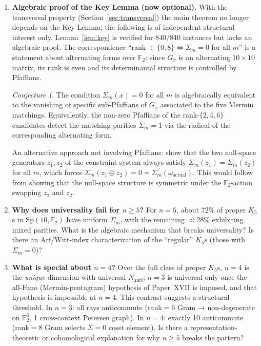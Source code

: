 \documentclass[11pt,a4paper]{article}
\theoremstyle{remark}
\newtheorem*{conjecture*}{Conjecture}
\newcommand{\Sp}{\mathrm{Sp}}
\begin{document}
\begin{enumerate}

\item\label{open:keylemma} \textbf{Algebraic proof of the Key Lemma (now optional).}
  With the transversal property (Section~\ref{sec:transversal}) the main theorem no
  longer depends on the Key Lemma; the following is of independent structural
  interest only.
  Lemma~\ref{lem:key} is verified for 840/840 instances but lacks an
  algebraic proof.
  The correspondence ``rank $\in \{0,8\} \Leftrightarrow \Sigma_m = 0$ for all $m$''
  is a statement about alternating forms over $\mathbb{F}_2$: since $G_x$ is an alternating
  $10 \times 10$ matrix, its rank is even and its determinantal structure is controlled
  by Pfaffians.
  \begin{conjecture*}
  The condition $\Sigma_m(x) = 0$ for all $m$ is algebraically equivalent to the vanishing
  of specific sub-Pfaffians of $G_x$ associated to the five Mermin matchings.
  Equivalently, the non-zero Pfaffians of the rank-$\{2,4,6\}$ candidates detect the
  matching parities $\Sigma_m = 1$ via the radical of the corresponding alternating form.
  \end{conjecture*}
  An alternative approach not involving Pfaffians: show that the two null-space generators
  $z_1, z_2$ of the constraint system always satisfy $\Sigma_m(z_1) = \Sigma_m(z_2)$
  for all $m$, which forces $\Sigma_m(z_1 \oplus z_2) = 0 = \Sigma_m(\omega_{\mathrm{actual}})$.
  This would follow from showing that the null-space structure is symmetric under the
  $\mathbb{F}_2$-action swapping $z_1$ and $z_2$.

\item\label{open:n5} \textbf{Why does universality fail for $n \geq 5$?}
  For $n = 5$, about $72\%$ of proper $K_5$s in $\Sp(10,\mathbb{F}_2)$
  have uniform $\Sigma_m$, with the remaining $\approx 28\%$ exhibiting mixed parities.
  What is the algebraic mechanism that breaks universality?
  Is there an Arf/Witt-index characterization of the ``regular'' $K_5$s
  (those with $\Sigma_m = 0$)?

\item\label{open:specialn} \textbf{What is special about $n=4$?}
  Over the full class of proper $K_5$s, $n=4$ is the \emph{unique} dimension with
  universal $N_{\mathrm{anti}}$; $n=3$ is universal only once the all-Fano
  (Mermin-pentagram) hypothesis of Paper~XVII is imposed, and that hypothesis is
  impossible at $n=4$.
  This contrast suggests a structural threshold.
  In $n=3$: all rays anticommute (rank$=6$ Gram → non-degenerate on $\mathbb{F}_2^6$,
  1 cross-context Petersen graph).
  In $n=4$: exactly 10 anticommute (rank$=8$ Gram selects $\Sigma=0$ coset element).
  Is there a representation-theoretic or cohomological explanation for why
  $n \geq 5$ breaks the pattern?

\end{enumerate}
\end{document}
